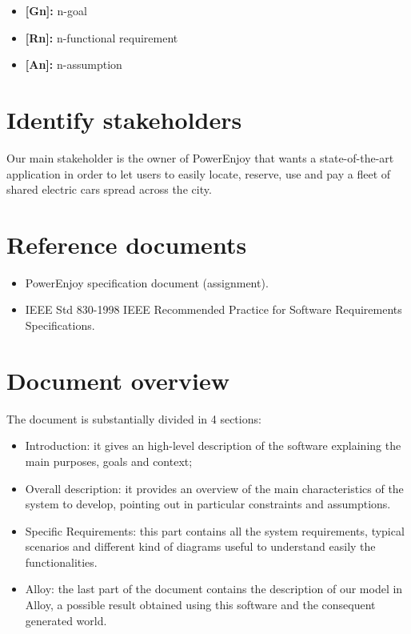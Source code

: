 \begin{itemize}
\item \textbf{{[Gn]}:} n-goal
\item \textbf{{[Rn]}:} n-functional requirement
\item \textbf{{[An]}:} n-assumption
\end{itemize}

\section{Identify stakeholders}

Our main stakeholder is the owner of PowerEnjoy that wants a state-of-the-art application in order to let users to easily locate, reserve, use and pay a fleet of shared electric cars spread across the city.

\section{Reference documents}

\begin{itemize}
\item PowerEnjoy specification document (assignment).
\item IEEE Std 830-1998 IEEE Recommended Practice for Software Requirements Specifications.
\end{itemize}
\section{Document overview}
The document is substantially divided in 4 sections:
\begin{itemize}
\item Introduction: it gives an high-level description of the software explaining the main purposes, goals and context;
\item Overall description: it provides an overview of the main characteristics of the system to develop, pointing out in particular constraints and assumptions.
\item Specific Requirements: this part contains all the system requirements, typical scenarios and different kind of diagrams useful to understand easily the functionalities.
\item Alloy: the last part of the document contains the description of our model in Alloy, a possible result obtained using this software and the consequent generated world.
\end{itemize}
